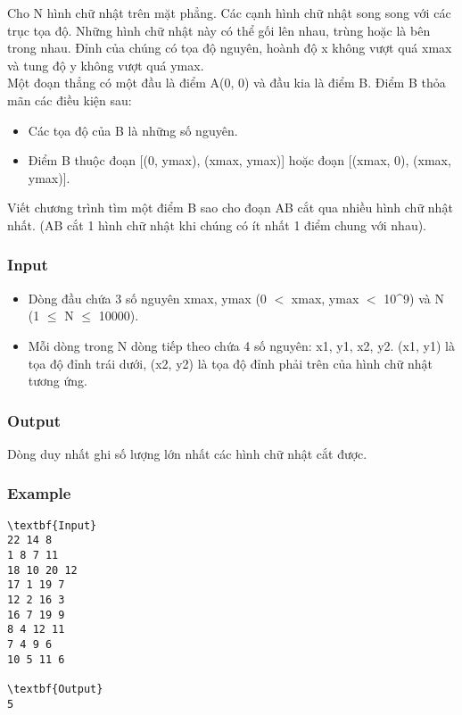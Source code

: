 

Cho N hình chữ nhật trên mặt phẳng. Các cạnh hình chữ nhật song song với các trục tọa độ. Những hình chữ nhật này có thể gối lên nhau, trùng hoặc là bên trong nhau. Đỉnh của chúng có tọa độ nguyên, hoành độ x không vượt quá xmax và tung độ y không vượt quá ymax.
\\Một đoạn thẳng có một đầu là điểm A(0, 0) và đầu kia là điểm B. Điểm B thỏa mãn các điều kiện sau:
\begin{itemize}
	\item Các tọa độ của B là những số nguyên.
	\item Điểm B thuộc đoạn [(0, ymax), (xmax, ymax)] hoặc đoạn [(xmax, 0), (xmax, ymax)].
\end{itemize}

Viết chương trình tìm một điểm B sao cho đoạn AB cắt qua nhiều hình chữ nhật nhất. (AB cắt 1 hình chữ nhật khi chúng có ít nhất 1 điểm chung với nhau).

\subsubsection{Input}
\begin{itemize}
	\item Dòng đầu chứa 3 số nguyên xmax, ymax (0 $<$ xmax, ymax $<$ 10\textasciicircum9) và N (1  $\le$  N  $\le$  10000).
	\item Mỗi dòng trong N dòng tiếp theo chứa 4 số nguyên: x1, y1, x2, y2. (x1, y1) là tọa độ đỉnh trái dưới, (x2, y2) là tọa độ đỉnh phải trên của hình chữ nhật tương ứng.
\end{itemize}

\subsubsection{Output}

Dòng duy nhất ghi số lượng lớn nhất các hình chữ nhật cắt được.

\subsubsection{Example}
\begin{verbatim}
\textbf{Input}
22 14 8
1 8 7 11
18 10 20 12
17 1 19 7
12 2 16 3
16 7 19 9
8 4 12 11
7 4 9 6
10 5 11 6

\textbf{Output}
5
\end{verbatim}
